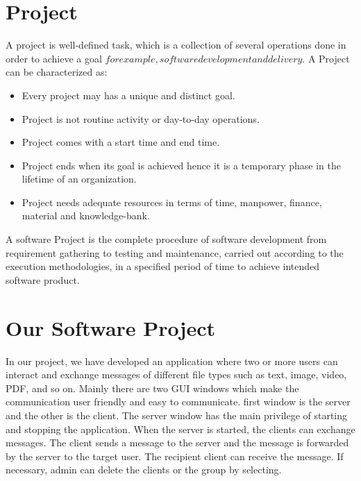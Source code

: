     \section{Project}\label{sec:project}
    A project is well-defined task, which is a collection of several operations done in order to
    achieve a goal \(for example, software development and delivery\).
    \medskip
    \noindent
    A Project can be characterized as:
    \begin{itemize}
        \item Every project may has a unique and distinct goal.
        \item Project is not routine activity or day-to-day operations.
        \item Project comes with a start time and end time.
        \item Project ends when its goal is achieved hence it is a temporary phase in the lifetime
                of an organization.
        \item Project needs adequate resources in terms of time, manpower, finance, material and
                knowledge-bank.
    \end{itemize}

    A software Project is the complete procedure of software development from requirement gathering
    to testing and maintenance, carried out according to the execution methodologies,
    in a specified period of time to achieve intended software product.

   \section{Our Software  Project}\label{sec:our-software--project}
    In our project, we have developed an application where two or more users can interact and
    exchange messages of different file types such as text, image, video, PDF, and so on.
    Mainly there are two GUI windows which make the communication user friendly and easy to
    communicate.
    first window is the server and the other is the client.
    The server window has the main privilege of starting and stopping the application.
    When the server is started, the clients can exchange messages.
    The client sends a message to the server and the message is forwarded by the server to the
    target user.
    The recipient client can receive the message.
    If necessary, admin can delete the clients or the group by selecting.
    \medskip
    
